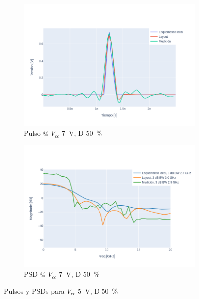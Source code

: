 \begin{figure}[t!]
    \centering
    \begin{subfigure}[b]{0.49\textwidth}
        \centering
        \includegraphics[width=\textwidth]{images/plots/Vcc_7V_duty_50_time_domain.png}
        \caption{Pulso @ $V_{cc}$ \qty{7}{\volt}, D \qty{50}{\percent} }
        \label{fig:pulses_7v_50}
    \end{subfigure}
    \hfill
    \begin{subfigure}[b]{0.49\textwidth}
        \centering
        \includegraphics[width=\textwidth]{images/plots/Vcc_7V_duty_50_psd.png}
        \caption{PSD @ $V_{cc}$ \qty{7}{\volt}, D \qty{50}{\percent} }
        \label{fig:psd_7v_50}
    \end{subfigure}
    \caption{Pulsos y PSDs para $V_{cc}$ \qty{5}{\volt}, D \qty{50}{\percent} }
    \label{fig:plots_7v_50}
\end{figure}

